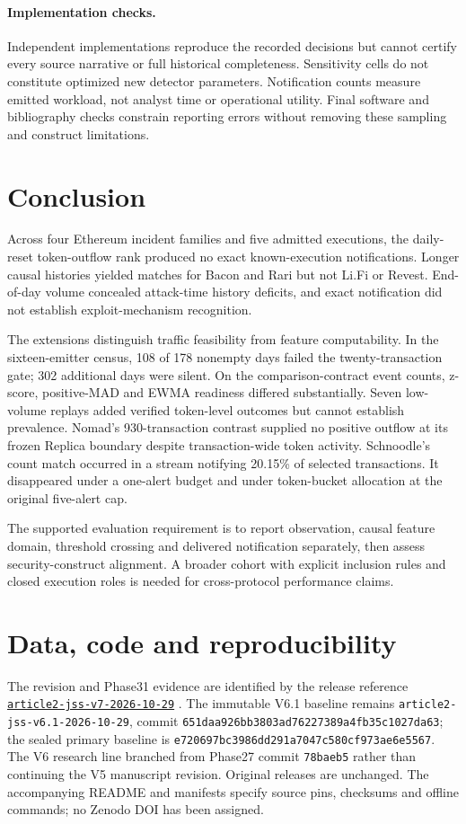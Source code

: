 \documentclass[preprint,12pt,authoryear]{elsarticle}
\begin{document}
\paragraph{Implementation checks.} Independent implementations reproduce the recorded decisions but cannot certify every source narrative or full historical completeness. Sensitivity cells do not constitute optimized new detector parameters. Notification counts measure emitted workload, not analyst time or operational utility. Final software and bibliography checks constrain reporting errors without removing these sampling and construct limitations.

\section{Conclusion}\label{sec:conclusion}
Across four Ethereum incident families and five admitted executions, the daily-reset token-outflow rank produced no exact known-execution notifications. Longer causal histories yielded matches for Bacon and Rari but not Li.Fi or Revest. End-of-day volume concealed attack-time history deficits, and exact notification did not establish exploit-mechanism recognition.

The extensions distinguish traffic feasibility from feature computability. In the sixteen-emitter census, 108 of 178 nonempty days failed the twenty-transaction gate; 302 additional days were silent. On the comparison-contract event counts, z-score, positive-MAD and EWMA readiness differed substantially. Seven low-volume replays added verified token-level outcomes but cannot establish prevalence. Nomad's 930-transaction contrast supplied no positive outflow at its frozen Replica boundary despite transaction-wide token activity. Schnoodle's count match occurred in a stream notifying 20.15\% of selected transactions. It disappeared under a one-alert budget and under token-bucket allocation at the original five-alert cap.

The supported evaluation requirement is to report observation, causal feature domain, threshold crossing and delivered notification separately, then assess security-construct alignment. A broader cohort with explicit inclusion rules and closed execution roles is needed for cross-protocol performance claims.

\section*{Data, code and reproducibility}
The revision and Phase31 evidence are identified by the release reference \href{https://github.com/KuznetsovKarazin/blockchain-analytics-lab/tree/article2-jss-v7-2026-10-29}{\texttt{article2-jss-v7-2026-10-29}} \citep{Kuznetsov2026Artifacts}. The immutable V6.1 baseline remains \texttt{article2-jss-v6.1-2026-10-29}, commit \texttt{651daa926bb3803ad76227389a4fb35c1027da63}; the sealed primary baseline is \texttt{e720697bc3986dd291a7047c580cf973ae6e5567}. The V6 research line branched from Phase27 commit \texttt{78baeb5} rather than continuing the V5 manuscript revision. Original releases are unchanged. The accompanying README and manifests specify source pins, checksums and offline commands; no Zenodo DOI has been assigned.
\end{document}
